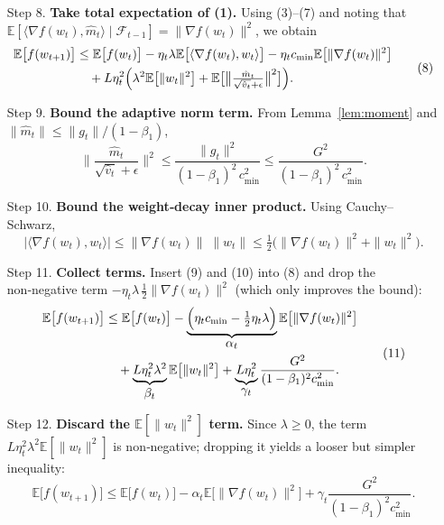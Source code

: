 \documentclass{article}
\newcommand{\EE}{\mathbb{E}}
\begin{document}
\begin{enumerate}
\item[Step 8.] \textbf{Take total expectation of (1).}
Using (3)–(7) and noting that $\EE[\langle\nabla f(w_t),\hat m_t\rangle\mid\mathcal{F}_{t-1}]
 = \|\nabla f(w_t)\|^2$, we obtain
\[
\begin{aligned}
\EE\bigl[f(w_{t+1})\bigr]
&\le \EE\bigl[f(w_t)\bigr]
   -\eta_t\lambda\EE\bigl[\langle\nabla f(w_t),w_t\rangle\bigr]
   -\eta_t c_{\min}\EE\bigl[\|\nabla f(w_t)\|^2\bigr] \\
&\quad + L\eta_t^2\Bigl(
      \lambda^2\EE\bigl[\|w_t\|^2\bigr]
      + \EE\bigl[\big\|\tfrac{\hat m_t}{\sqrt{\hat v_t}+\epsilon}\big\|^2\bigr]\Bigr).
\end{aligned}
\tag{8}
\]

\item[Step 9.] \textbf{Bound the adaptive norm term.}
From Lemma~\ref{lem:moment} and $\|\hat m_t\|\le\|g_t\|/(1-\beta_1)$,
\[
\Big\|\frac{\hat m_t}{\sqrt{\hat v_t}+\epsilon}\Big\|^2
\le
\frac{\|g_t\|^2}{(1-\beta_1)^2\,c_{\min}^2}
\le
\frac{G^2}{(1-\beta_1)^2\,c_{\min}^2}.
\tag{9}
\]

\item[Step 10.] \textbf{Bound the weight‑decay inner product.}
Using Cauchy–Schwarz,
\[
|\langle\nabla f(w_t),w_t\rangle|
\le \|\nabla f(w_t)\|\;\|w_t\|
\le \tfrac12\bigl(\|\nabla f(w_t)\|^2+\|w_t\|^2\bigr).
\tag{10}
\]

\item[Step 11.] \textbf{Collect terms.}
Insert (9) and (10) into (8) and drop the non‑negative term $-\eta_t\lambda\,\tfrac12\|\nabla f(w_t)\|^2$ (which only improves the bound):
\[
\begin{aligned}
\EE\bigl[f(w_{t+1})\bigr]
&\le \EE\bigl[f(w_t)\bigr]
   -\underbrace{\Bigl(\eta_t c_{\min}
          -\tfrac12\eta_t\lambda\Bigr)}_{\displaystyle\alpha_t}
      \EE\bigl[\|\nabla f(w_t)\|^2\bigr] \\
&\quad + \underbrace{L\eta_t^2\lambda^2}_{\displaystyle\beta_t}
      \EE\bigl[\|w_t\|^2\bigr]
   + \underbrace{L\eta_t^2}_{\displaystyle\gamma_t}
      \frac{G^2}{(1-\beta_1)^2c_{\min}^2}.
\end{aligned}
\tag{11}
\]

\item[Step 12.] \textbf{Discard the $\EE[\|w_t\|^2]$ term.}
Since $\lambda\ge0$, the term $L\eta_t^2\lambda^2\EE[\|w_t\|^2]$
is non‑negative; dropping it yields a looser but simpler inequality:
\[
\EE\bigl[f(w_{t+1})\bigr]
\le \EE\bigl[f(w_t)\bigr]
   -\alpha_t\EE\bigl[\|\nabla f(w_t)\|^2\bigr]
   +\gamma_t\frac{G^2}{(1-\beta_1)^2c_{\min}^2}.
\tag{12}
\]


\end{enumerate}
\end{document}
